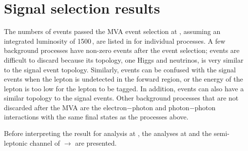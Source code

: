 \section{Signal selection results}
\label{sec:doubleHiggsSignalSelResult}

The numbers of events passed the MVA event selection at , assuming an integrated luminosity of 1500\,,  are listed in  for individual processes. A few  background processes have non-zero events after the event selection; \eeTo{\Pquark \APquark \PHiggs \Pnu \APnu} events are difficult to discard because its topology, one Higgs and neutrinos, is very similar to the signal event topology. Similarly, \eeTo{ \Pquark \Pquark \Pquark \Pquark \Plepton \Pnu} events can be confused with the signal events when the lepton is undetected in the forward region, or the energy of the lepton is too low for the lepton to be tagged. In addition, \eeTo{ \Pquark \Pquark \Pquark \Pquark \Pnu \APnu} events can also have a similar topology to the signal events. Other background processes that are not discarded after the MVA are the electron$-$photon and photon$-$photon interactions with the same final states as the processes above.


Before interpreting the result for analysis at , the analyses at  and  the semi-leptonic channel of \eeToHH $\to$ \HepProcess{ \Pbottom \APbottom \PWplus \PWminus \Pnue \APnue} are presented.





